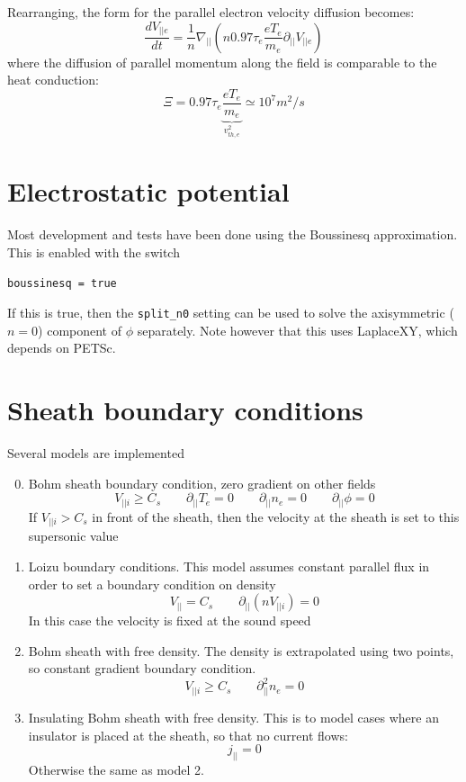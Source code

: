\documentclass[12pt,a4paper]{article}
\begin{document}
Rearranging, the form for the parallel electron velocity diffusion becomes:
\[
\frac{dV_{||e}}{dt} = \frac{1}{n}\nabla_{||}\left( n 0.97 \tau_e \frac{eT_e}{m_e} \partial_{||} V_{||e}\right)
\]
where the diffusion of parallel momentum along the field is comparable to the heat conduction:
\[
\Xi = 0.97 \tau_e \underbrace{\frac{eT_e}{m_e}}_{v_{th,e}^2} \simeq 10^{7} m^2/s
\]


\section{Electrostatic potential}

Most development and tests have been done using the Boussinesq approximation. This is enabled with the switch
\begin{verbatim}
boussinesq = true
\end{verbatim}
If this is true, then the \texttt{split\_n0} setting can be
used to solve the axisymmetric ($n=0$) component of $\phi$ separately. Note however that this uses LaplaceXY, which depends on PETSc.

\section{Sheath boundary conditions}

Several models are implemented
\begin{enumerate}
  \setcounter{enumi}{-1}  %
\item Bohm sheath boundary condition, zero gradient on other fields
  \[
  V_{||i} \ge C_s \qquad \partial_{||}T_e = 0 \qquad \partial_{||}n_e = 0 \qquad \partial_{||}\phi = 0
  \]
  If $V_{||i} > C_s$ in front of the sheath, then the velocity at the sheath is set to this supersonic value
\item Loizu boundary conditions. This model assumes constant parallel flux in order to set a boundary condition on density
  \[
  V_{||} = C_s \qquad \partial_{||}\left(nV_{||i}\right) = 0
  \]
  In this case the velocity is fixed at the sound speed
\item Bohm sheath with free density. The density is extrapolated using two points, so constant gradient boundary condition.
  \[
  V_{||i} \ge C_s \qquad \partial_{||}^2n_e = 0
  \]
\item Insulating Bohm sheath with free density. This is to model cases where an insulator is placed at the sheath, so
  that no current flows:
  \[
  j_{||} = 0
  \]
  Otherwise the same as model 2.
\end{enumerate}
\end{document}
